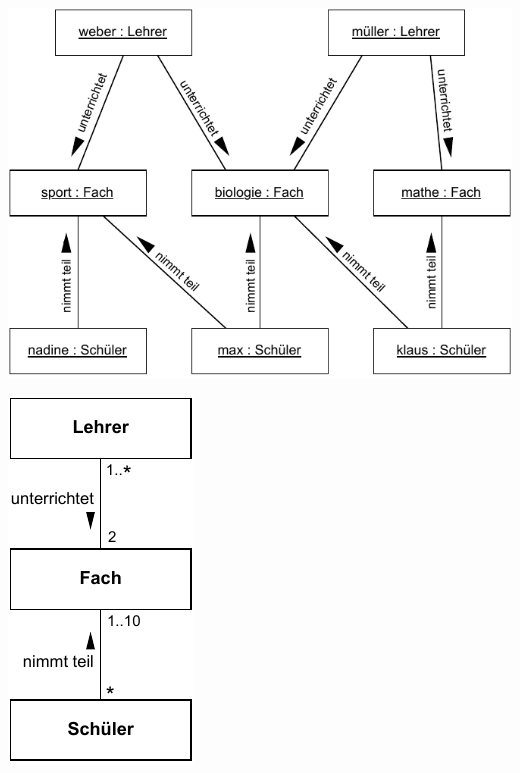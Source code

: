 \begin{center}
	\begin{minipage}[c]{.6\linewidth} 
		\includegraphics[scale=0.7]{Bilder/Kapitel-4/objektdiagramm_lehrer_fach_schueler.pdf}
	\end{minipage}
	\hspace{.1\linewidth}%
	\begin{minipage}[c]{.2\linewidth}
		\includegraphics[scale=0.7]{Bilder/Kapitel-4/klassendiagramm_lehrer_fach_schueler.pdf}
	\end{minipage}
\end{center}

